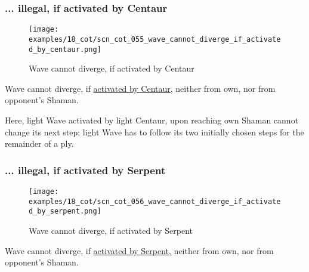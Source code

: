 \subsubsection*{... illegal, if activated by Centaur}
\label{sec:Conquest of Tlalocan/Divergence/... illegal, if activated by Centaur}

\vspace*{-1.4\baselineskip}
\noindent
\begin{figure}[!h]
\texttt{[image: examples/18\_cot/scn\_cot\_055\_wave\_cannot\_diverge\_if\_activated\_by\_centaur.png]}
\vspace*{-1.3\baselineskip}
\caption{Wave cannot diverge, if activated by Centaur}
\label{fig:scn_cot_055_wave_cannot_diverge_if_activated_by_centaur}
\end{figure}

\vspace*{-0.5\baselineskip}
Wave cannot diverge, if
\hyperref[fig:scn_hd_07_wave_activation_by_centaur_first_step]{activated by Centaur},
neither from own, nor from opponent's Shaman.

Here, light Wave activated by light Centaur, upon reaching own Shaman cannot change
its next step; light Wave has to follow its two initially chosen steps for the
remainder of a ply.

\clearpage %

\subsubsection*{... illegal, if activated by Serpent}
\label{sec:Conquest of Tlalocan/Divergence/... illegal, if activated by Serpent}

\vspace*{-1.4\baselineskip}
\noindent
\begin{figure}[!h]
\texttt{[image: examples/18\_cot/scn\_cot\_056\_wave\_cannot\_diverge\_if\_activated\_by\_serpent.png]}
\vspace*{-1.3\baselineskip}
\caption{Wave cannot diverge, if activated by Serpent}
\label{fig:scn_cot_056_wave_cannot_diverge_if_activated_by_serpent}
\end{figure}

\vspace*{-0.5\baselineskip}
Wave cannot diverge, if
\hyperref[fig:scn_tr_40_serpent_activating_wave]{activated by Serpent},
neither from own, nor from opponent's Shaman.

